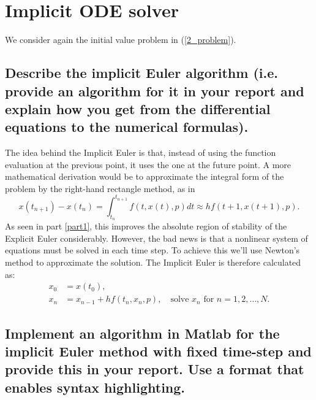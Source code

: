 \section{Implicit ODE solver} \label{part3}
We consider again the initial value problem in (\ref{2_problem}).

\subsection{Describe the implicit Euler algorithm (i.e. provide an algorithm for it in
your report and explain how you get from the differential equations to the
numerical formulas).}
The idea behind the Implicit Euler is that, instead of using the function evaluation at the previous point, it uses the one at the future point. A more mathematical derivation would be to approximate the integral form of the problem by the right-hand rectangle method, as in
\begin{equation*}
    x(t_{n+1})- x(t_n) = \int_{t_n}^{t_{n+1}} f(t,x(t),p) dt \approx hf(t+1,x(t+1),p).
\end{equation*}
As seen in part \ref{part1}, this improves the absolute region of stability of the Explicit Euler considerably. However, the bad news is that a nonlinear system of equations must be solved in each time step. To achieve this we'll use Newton's method to approximate the solution. The Implicit Euler is therefore calculated as:
\begin{align*}
    x_0 &= x(t_0), \\
    x_n &= x_{n-1} + hf(t_n, x_n, p), \hspace{1em} \text{solve } x_n \text{ for } n = 1,2,\ldots, N.
\end{align*}


\subsection{Implement  an  algorithm  in  Matlab  for  the  implicit  Euler  method  with
 fixed time-step and provide this in your report.  Use a format that enables
syntax highlighting.}

